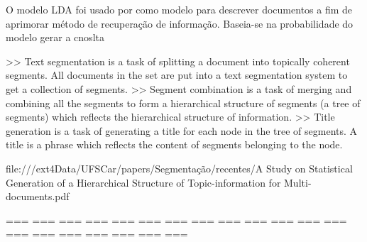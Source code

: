 





























O modelo LDA foi usado por \cite{XINGWEI} como modelo para descrever documentos a fim de aprimorar método de recuperação de informação. Baseia-se na probabilidade do modelo gerar a cnoslta

















>> Text segmentation is a task of splitting a document into topically coherent segments.  All documents in the set are put into a text segmentation system to get a collection of segments.
>> Segment combination is a task of merging and combining all the segments to form a hierarchical structure of segments (a tree of segments) which reflects the hierarchical structure of information.
>> Title generation is a task of generating a title for each node in the tree of segments. A title is a phrase which reflects the content of segments belonging to the node.


file:///ext4Data/UFSCar/papers/Segmentação/recentes/A Study on Statistical Generation of a Hierarchical Structure of Topic-information for Multi-documents.pdf
~\cite{NGUYEN Viet Cuong}

=== === === === === === === === === === === === === === === === === === === === 



